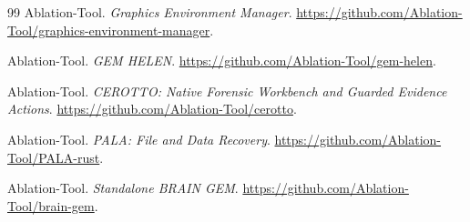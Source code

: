 \begin{thebibliography}{99}
Ablation-Tool.
\newblock \emph{Graphics Environment Manager}.
\newblock \url{https://github.com/Ablation-Tool/graphics-environment-manager}.

Ablation-Tool.
\newblock \emph{GEM HELEN}.
\newblock \url{https://github.com/Ablation-Tool/gem-helen}.

Ablation-Tool.
\newblock \emph{CEROTTO: Native Forensic Workbench and Guarded Evidence Actions}.
\newblock \url{https://github.com/Ablation-Tool/cerotto}.

Ablation-Tool.
\newblock \emph{PALA: File and Data Recovery}.
\newblock \url{https://github.com/Ablation-Tool/PALA-rust}.

Ablation-Tool.
\newblock \emph{Standalone BRAIN GEM}.
\newblock \url{https://github.com/Ablation-Tool/brain-gem}.

\end{thebibliography}
